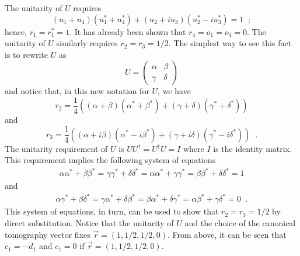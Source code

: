 The unitarity of $U$ requires
$$
(u_1+u_4) (u_1^*+u_4^*)+(u_2+iu_3)(u_2^*-iu_3^*) = 1\;\;;
$$
hence, $r_1=r_1^*=1$.  It has already been shown that $r_4=o_1=o_4=0$.  The unitarity of $U$ similarly requires $r_2=r_3=1/2$.  The simplest way to see this fact is to rewrite $U$ as
$$
U = \begin{pmatrix}
\alpha&\beta\\
\gamma&\delta
\end{pmatrix}
$$
and notice that, in this new notation for $U$, we have
$$
r_2 = \frac{1}{4} \left(\left(\alpha+\beta\right) \left(\alpha^*+\beta^*\right)+\left(\gamma+\delta\right) \left(\gamma^*+\delta^*\right)\right)
$$
and
$$
r_3 = \frac{1}{4} \left(\left(\alpha+i \beta\right) \left(\alpha^*-i \beta^*\right)+\left(\gamma+i \delta\right) \left(\gamma^*-i \delta^*\right)\right)\;\;.
$$
The unitarity requirement of $U$ is $UU^\dagger=U^\dagger U=I$ where $I$ is the identity matrix.  This requirement implies the following system of equations
\begin{eqnarray*}
\alpha \alpha^* + \beta \beta^* = \gamma\gamma^*+\delta\delta^* = \alpha \alpha^* +\gamma\gamma^* =  \beta \beta^*+\delta\delta^* = 1
\end{eqnarray*}
and
\begin{eqnarray*}
\alpha \gamma^* + \beta\delta^* = \gamma \alpha^* + \delta \beta^* =\beta \alpha^* + \delta \gamma^* = \alpha \beta^* + \gamma \delta^* = 0\;\;.
\end{eqnarray*}
This system of equations, in turn, can be used to show that $r_2=r_3=1/2$ by direct substitution.  Notice that the unitarity of $U$ and the choice of the canonical tomography vector fixes $\vec{r} = (1,1/2,1/2,0)$.  From above, it can be seen that $c_1 = -d_1$ and $c_1 = 0 $ if $\vec{r} = (1,1/2,1/2,0)$.

